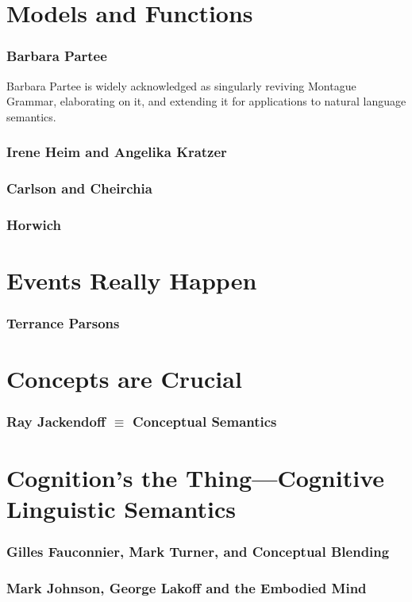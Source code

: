 
\section{Models and Functions}
\subsubsection{Barbara Partee}
Barbara Partee is widely acknowledged as singularly reviving Montague Grammar, elaborating on it, and extending it for applications to natural language semantics.
\subsubsection{Irene Heim and Angelika Kratzer}
\subsubsection{Carlson and Cheirchia}
\subsubsection{Horwich}

\section{Events Really Happen}
\subsubsection{Terrance Parsons}

\section{Concepts are Crucial}
\subsubsection{Ray Jackendoff $\equiv$ Conceptual Semantics}

\section{Cognition's the Thing---Cognitive Linguistic Semantics}
\subsubsection{Gilles Fauconnier, Mark Turner, and Conceptual Blending}
\subsubsection{Mark Johnson, George Lakoff and the Embodied Mind}


